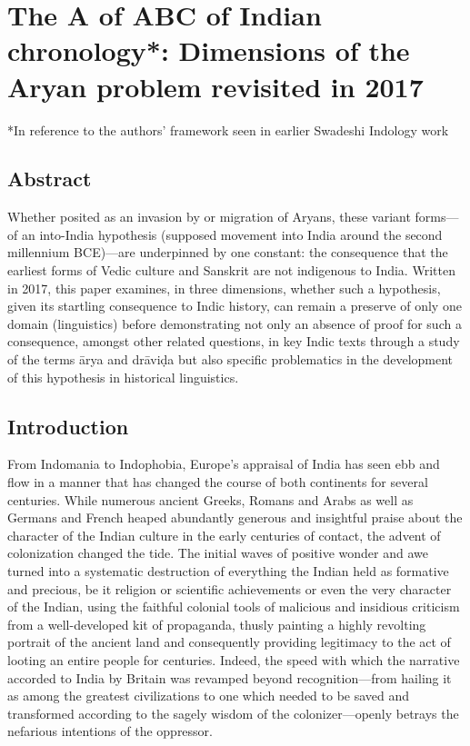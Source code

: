 
\chapter{The A of ABC of Indian chronology*: Dimensions of the Aryan problem revisited in 2017}\label{chapter2}


*In reference to the authors’ framework seen in earlier Swadeshi Indology work

\vskip -10pt

\section*{Abstract}

Whether posited as an invasion by or migration of Aryans, these variant forms—of an into-India hypothesis (supposed movement into India around the second millennium BCE)—are underpinned by one constant: the consequence that the earliest forms of Vedic culture and Sanskrit are not indigenous to India. Written in 2017, this paper examines, in three dimensions, whether such a hypothesis, given its startling consequence to Indic history, can remain a preserve of only one domain (linguistics) before demonstrating not only an absence of proof for such a consequence, amongst other related questions, in key Indic texts through a study of the terms ārya and drāviḍa but also specific problematics in the development of this hypothesis in historical linguistics.

\newpage


\section{Introduction}

From Indomania to Indophobia, Europe’s appraisal of India has seen ebb and flow in a manner that has changed the course of both continents for several centuries. While numerous ancient Greeks, Romans and Arabs as well as Germans and French heaped abundantly generous and insightful praise about the character of the Indian culture in the early centuries of contact, the advent of colonization changed the tide. The initial waves of positive wonder and awe turned into a systematic destruction of everything the Indian held as formative and precious, be it religion or scientific achievements or even the very character of the Indian, using the faithful colonial tools of malicious and insidious criticism from a well-developed kit of propaganda, thusly painting a highly revolting portrait of the ancient land and consequently providing legitimacy to the act of looting an entire people for centuries. Indeed, the speed with which the narrative accorded to India by Britain was revamped beyond recognition—from hailing it as among the greatest civilizations to one which needed to be saved and transformed according to the sagely wisdom of the colonizer—openly betrays the nefarious intentions of the oppressor.

